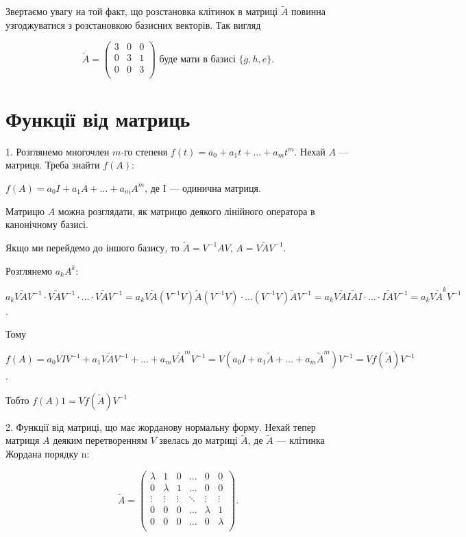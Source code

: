 Звертаємо увагу на той факт, що розстановка клітинок в матриці $\tilde{A}$ повинна
узгоджуватися з розстановкою базисних векторів. Так вигляд

$$\tilde{A} = \begin{pmatrix}
	3 & 0 & 0 \\
	0 & 3 & 1 \\
	0 & 0 & 3 \\
\end{pmatrix} \text{ буде мати в базисі } \{g, h, e\}. $$ 

\section{Функції від матриць}

1. Розглянемо многочлен $m$-го степеня $f(t) = a_0 + a_1 t + ... + a_m t^m$.
Нехай $A$ --- матриця. Треба знайти $f(A)$:

$f(A) = a_0 I + a_1 A + ... + a_m A^m$, де I --- одинична матриця.

Матрицю $A$ можна розглядати, як матрицю деякого лінійного оператора в
канонічному базисі.

Якщо ми перейдемо до іншого базису, то $\tilde{A} = V^{-1} A V$, $A = V \tilde{A} V^{-1}$.

Розглянемо $a_k A^k$:

$a_k V \tilde{A} V^{-1} \cdot V \tilde{A} V^{-1} \cdot ... \cdot V \tilde{A} V^{-1}
=a_k V \tilde{A} (V^{-1} V) \tilde{A} (V^{-1}V) \cdot ... (V^{-1}V) \tilde{A} V^{-1}
= a_k V \tilde{A}I\tilde{A}I \cdot ... \cdot I\tilde{A}V^{-1}
= a_k V \tilde{A}^k V^{-1}$.

Тому 

$f(A) = a_0 V I V^{-1} + a_1 V \tilde{A} V^{-1} + ... + a_m V \tilde{A}^m V^{-1}
= V(a_0 I + a_1 \tilde{A} + ... + a_m \tilde{A}^m) V^{-1}
= Vf(\tilde{A})V^{-1}$.

Тобто $f(A)1 = Vf(\tilde{A})V^{-1}$

2. Функції від матриці, що має жорданову нормальну форму.
Нехай тепер матриця $A$ деяким перетворенням $V$ звелась до матриці $\tilde{A}$, де
$\tilde{A}$ --- клітинка Жордана порядку n:

$$\tilde{A} = \begin{pmatrix}
	\lambda & 1 & 0 & ... & 0 & 0 \\
	0 & \lambda & 1 & ... & 0 & 0 \\
	\vdots & \vdots & \vdots & \ddots & \vdots & \vdots \\
	0 & 0 & 0 & ... & \lambda & 1 \\
	0 & 0 & 0 & ... & 0 & \lambda \\
\end{pmatrix}. $$


